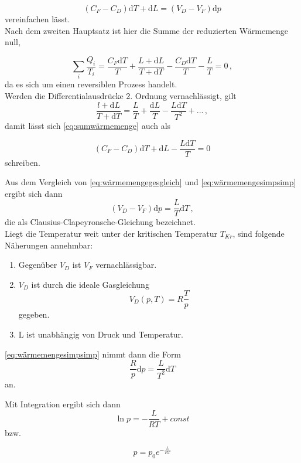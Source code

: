 \begin{equation}
    (C_F - C_D) \mathrm{d}T + \mathrm{d}L = (V_D - V_F) \mathrm{d}p
    \label{eq:wärmemengegesgleich}
\end{equation} vereinfachen lässt. \\

Nach dem zweiten Hauptsatz ist hier die Summe der reduzierten Wärmemenge null,

\begin{equation}
    \sum_i \frac{Q_i}{T_i} = \frac{C_F \mathrm{d}T}{T} + \frac{L + \mathrm{d}L}{T + \mathrm{d}T} - \frac{C_D \mathrm{d}T}{T} - \frac{L}{T} = 0 \,,
    \label{eq:sumwärmemenge}
\end{equation} da es sich um einen reversiblen Prozess handelt. \\

Werden die Differentialausdrücke 2. Ordnung vernachlässigt, gilt
\begin{equation}
    \frac{l + \mathrm{d}L}{T + \mathrm{d}T} = \frac{L}{T} + \frac{\mathrm{d}L}{T} - \frac{L \mathrm{d}T}
    {T^2} + ... \,,
    \label{eq:sumwärmemengesimp}
\end{equation} damit lässt sich \eqref{eq:sumwärmemenge} auch als

\begin{equation}
    (C_F - C_D) \mathrm{d}T + \mathrm{d}L - \frac{L \mathrm{d}T}{T} = 0 
    \label{eq:wärmemengesimpsimp}
\end{equation} schreiben.

Aus dem Vergleich von \eqref{eq:wärmemengegesgleich} und \eqref{eq:wärmemengesimpsimp} ergibt sich dann
\begin{equation}
    (V_D - V_F) \mathrm{d}p = \frac{L}{T} \mathrm{d}T \,,
    \label{eq:clausiusclapeyronschegleichung}
\end{equation} die als Clausius-Clapeyronsche-Gleichung bezeichnet. \\

Liegt die Temperatur weit unter der kritischen Temperatur $T_{Kr}$, sind folgende Näherungen annehmbar:
\begin{enumerate}
    \item Gegenüber $V_D$ ist $V_F$ vernachlässigbar.
    \item $V_D$ ist durch die ideale Gasgleichung 
    \begin{equation}
        V_D(p,T) = R \frac{T}{p}
    \end{equation} gegeben.
    \item L ist unabhängig von Druck und Temperatur.
\end{enumerate}

\eqref{eq:wärmemengesimpsimp} nimmt dann die Form
\begin{equation}
    \frac{R}{p} \mathrm{d}p = \frac{L}{T^2} \mathrm{d}T
\end{equation} an.

Mit Integration ergibt sich dann
\begin{equation}
    \ln p = - \frac{L}{RT} + const
\end{equation} bzw.

\begin{equation}
    p = p_0 e^{-\frac{L}{RT}}
\end{equation}



